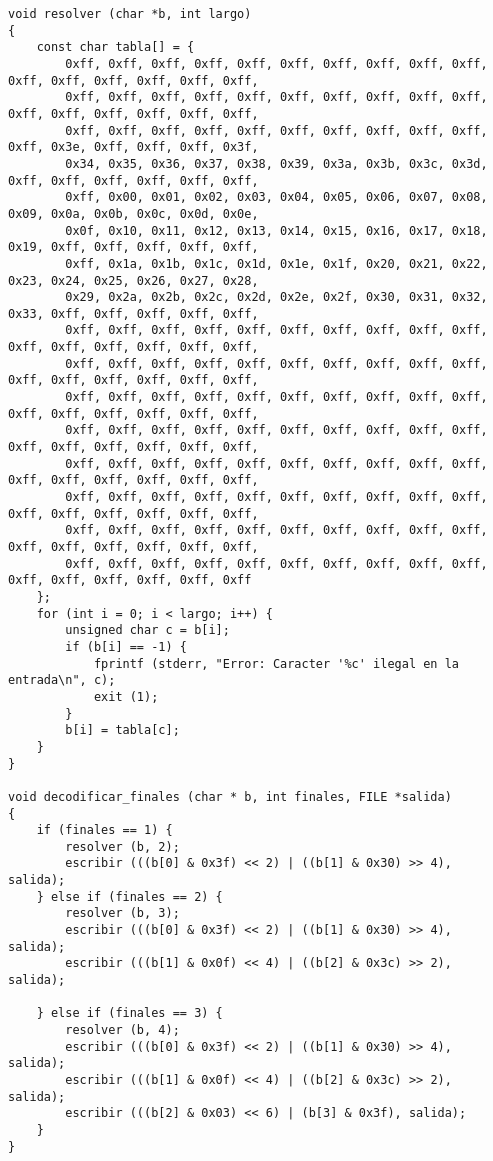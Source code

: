 \documentclass{article}
\begin{document}
\begin{verbatim}
void resolver (char *b, int largo)
{
	const char tabla[] = {
		0xff, 0xff, 0xff, 0xff, 0xff, 0xff, 0xff, 0xff, 0xff, 0xff, 0xff, 0xff, 0xff, 0xff, 0xff, 0xff, 
		0xff, 0xff, 0xff, 0xff, 0xff, 0xff, 0xff, 0xff, 0xff, 0xff, 0xff, 0xff, 0xff, 0xff, 0xff, 0xff, 
		0xff, 0xff, 0xff, 0xff, 0xff, 0xff, 0xff, 0xff, 0xff, 0xff, 0xff, 0x3e, 0xff, 0xff, 0xff, 0x3f, 
		0x34, 0x35, 0x36, 0x37, 0x38, 0x39, 0x3a, 0x3b, 0x3c, 0x3d, 0xff, 0xff, 0xff, 0xff, 0xff, 0xff, 
		0xff, 0x00, 0x01, 0x02, 0x03, 0x04, 0x05, 0x06, 0x07, 0x08, 0x09, 0x0a, 0x0b, 0x0c, 0x0d, 0x0e, 
		0x0f, 0x10, 0x11, 0x12, 0x13, 0x14, 0x15, 0x16, 0x17, 0x18, 0x19, 0xff, 0xff, 0xff, 0xff, 0xff, 
		0xff, 0x1a, 0x1b, 0x1c, 0x1d, 0x1e, 0x1f, 0x20, 0x21, 0x22, 0x23, 0x24, 0x25, 0x26, 0x27, 0x28, 
		0x29, 0x2a, 0x2b, 0x2c, 0x2d, 0x2e, 0x2f, 0x30, 0x31, 0x32, 0x33, 0xff, 0xff, 0xff, 0xff, 0xff, 
		0xff, 0xff, 0xff, 0xff, 0xff, 0xff, 0xff, 0xff, 0xff, 0xff, 0xff, 0xff, 0xff, 0xff, 0xff, 0xff, 
		0xff, 0xff, 0xff, 0xff, 0xff, 0xff, 0xff, 0xff, 0xff, 0xff, 0xff, 0xff, 0xff, 0xff, 0xff, 0xff, 
		0xff, 0xff, 0xff, 0xff, 0xff, 0xff, 0xff, 0xff, 0xff, 0xff, 0xff, 0xff, 0xff, 0xff, 0xff, 0xff, 
		0xff, 0xff, 0xff, 0xff, 0xff, 0xff, 0xff, 0xff, 0xff, 0xff, 0xff, 0xff, 0xff, 0xff, 0xff, 0xff, 
		0xff, 0xff, 0xff, 0xff, 0xff, 0xff, 0xff, 0xff, 0xff, 0xff, 0xff, 0xff, 0xff, 0xff, 0xff, 0xff, 
		0xff, 0xff, 0xff, 0xff, 0xff, 0xff, 0xff, 0xff, 0xff, 0xff, 0xff, 0xff, 0xff, 0xff, 0xff, 0xff, 
		0xff, 0xff, 0xff, 0xff, 0xff, 0xff, 0xff, 0xff, 0xff, 0xff, 0xff, 0xff, 0xff, 0xff, 0xff, 0xff, 
		0xff, 0xff, 0xff, 0xff, 0xff, 0xff, 0xff, 0xff, 0xff, 0xff, 0xff, 0xff, 0xff, 0xff, 0xff, 0xff
	};
	for (int i = 0; i < largo; i++) {
		unsigned char c = b[i];
		if (b[i] == -1) {
			fprintf (stderr, "Error: Caracter '%c' ilegal en la entrada\n", c);
			exit (1);
		}
		b[i] = tabla[c];
	}
}

void decodificar_finales (char * b, int finales, FILE *salida)
{
	if (finales == 1) {
		resolver (b, 2);
		escribir (((b[0] & 0x3f) << 2) | ((b[1] & 0x30) >> 4), salida);
	} else if (finales == 2) {
		resolver (b, 3);
		escribir (((b[0] & 0x3f) << 2) | ((b[1] & 0x30) >> 4), salida);
		escribir (((b[1] & 0x0f) << 4) | ((b[2] & 0x3c) >> 2), salida);

	} else if (finales == 3) {
		resolver (b, 4);
		escribir (((b[0] & 0x3f) << 2) | ((b[1] & 0x30) >> 4), salida);
		escribir (((b[1] & 0x0f) << 4) | ((b[2] & 0x3c) >> 2), salida);
		escribir (((b[2] & 0x03) << 6) | (b[3] & 0x3f), salida);
	}
}


\end{verbatim}
\end{document}
